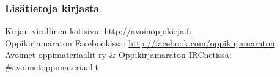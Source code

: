 %
%
%
%

\subsubsection*{Lisätietoja kirjasta}

Kirjan virallinen kotisivu: \url{http://avoinoppikirja.fi} \\
Oppikirjamaraton Facebookissa: \url{http://facebook.com/oppikirjamaraton} \\
Avoimet oppimateriaalit ry \& Oppikirjamaraton IRCnetissä: \#avoimetoppimateriaalit
